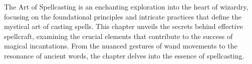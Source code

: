 The Art of Spellcasting is an enchanting exploration into the heart of wizardry, focusing on the foundational principles and intricate practices that define the mystical art of casting spells. This chapter unveils the secrets behind effective spellcraft, examining the crucial elements that contribute to the success of magical incantations. From the nuanced gestures of wand movements to the resonance of ancient words, the chapter delves into the essence of spellcasting.